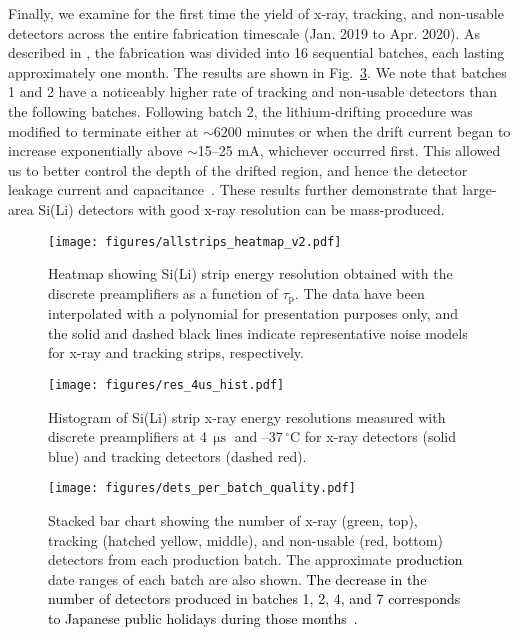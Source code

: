 \documentclass[journal]{IEEEtran}
\newcommand{\red}[1]{\textcolor{black}{#1}}
\begin{document}
%
\par Finally, we examine for the first time the yield of x-ray, tracking, and non-usable detectors across the entire fabrication timescale (Jan. 2019 to Apr. 2020). As described in \cite{Kozai:2019xlp,Kozai:2021apo}, the fabrication was divided into 16 sequential batches, each lasting approximately one month. The results are shown in Fig.~\ref{fig:batch_quality}. We note that batches 1 and 2 have a noticeably higher rate of tracking and non-usable detectors than the following batches. Following batch 2, the lithium-drifting procedure was modified to terminate either at ${\sim}6200$ minutes or when the drift current began to increase exponentially above ${\sim}$15--25 mA, whichever occurred first. This allowed us to better control the depth of the drifted region, and hence the detector leakage current and capacitance~\cite{Kozai:2019xlp,Kozai:2021apo}. These results further demonstrate that large-area Si(Li) detectors with good x-ray resolution can be mass-produced.
%
\begin{figure}[t]
\centering
\texttt{[image: figures/allstrips\_heatmap\_v2.pdf]}
\caption{Heatmap showing Si(Li) strip energy resolution obtained with the discrete preamplifiers as a function of $\tau_\text{p}$. The data have been interpolated with a polynomial for presentation purposes only, and the solid and dashed black lines indicate representative noise models for x-ray and tracking strips, respectively.}  
\label{figure:noisemodel_all_strips}
\end{figure}
%
\begin{figure}[t]
\texttt{[image: figures/res\_4us\_hist.pdf]}
\caption{Histogram of Si(Li) strip x-ray energy resolutions measured with discrete preamplifiers at 4$\,\upmu\text{s}$ and --37$\,^\circ\text{C}$ for x-ray detectors (solid blue) and tracking detectors (dashed red).}  
\label{fig:strip_fwhm_histogram}
\end{figure}
%
\begin{figure}[h]
\centering
\texttt{[image: figures/dets\_per\_batch\_quality.pdf]}
\caption{Stacked bar chart showing the number of x-ray (green, top), tracking (hatched yellow, middle), and non-usable (red, bottom) detectors from each production batch. The approximate \red{production} date ranges of each batch are also shown. \red{The decrease in the number of detectors produced in batches 1, 2, 4, and 
 7 corresponds to Japanese public holidays during those months~\cite{Kozai:2021apo}.}}  
\label{fig:batch_quality}
\end{figure}
%
\end{document}
